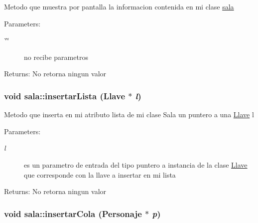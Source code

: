 Metodo que muestra por pantalla la informacion contenida en mi clase \hyperlink{classsala}{sala} \begin{Desc}
\item[Parameters:]
\begin{description}
\item[{\em \char`\"{}\char`\"{}}]no recibe parametros \end{description}
\end{Desc}
\begin{Desc}
\item[Returns:]No retorna ningun valor \end{Desc}
\hypertarget{classsala_43d8051f7213fd82d30b5b7b56043877}{
\subsubsection[insertarLista]{\setlength{\rightskip}{0pt plus 5cm}void sala::insertarLista ({\bf Llave} $\ast$ {\em l})}}
\label{classsala_43d8051f7213fd82d30b5b7b56043877}


Metodo que inserta en mi atributo lista de mi clase Sala un puntero a una \hyperlink{classLlave}{Llave} l \begin{Desc}
\item[Parameters:]
\begin{description}
\item[{\em l}]es un parametro de entrada del tipo puntero a instancia de la clase \hyperlink{classLlave}{Llave} que corresponde con la llave a insertar en mi lista \end{description}
\end{Desc}
\begin{Desc}
\item[Returns:]No retorna ningun valor \end{Desc}
\hypertarget{classsala_83833f513f3f53033e6e8fc3cacded73}{
\subsubsection[insertarCola]{\setlength{\rightskip}{0pt plus 5cm}void sala::insertarCola ({\bf Personaje} $\ast$ {\em p})}}
\label{classsala_83833f513f3f53033e6e8fc3cacded73}


